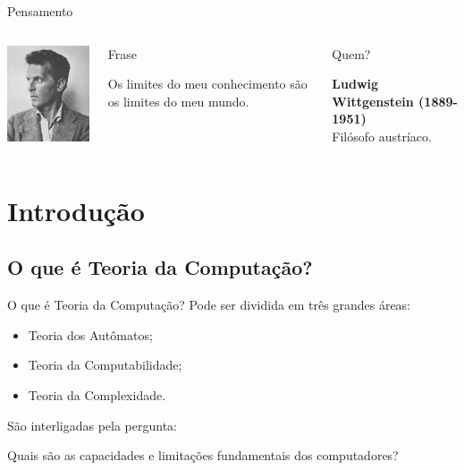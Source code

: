 \documentclass[xcolor=dvipsnames,table]{beamer}
\begin{document}
\begin{frame}{Pensamento}
	\begin{columns}
		\begin{center}
			\includegraphics[height=.5\textheight]{images/wittgenstein.jpg}
		\end{center}
		\begin{block}{Frase}
			\begin{center}
				{\large Os limites do meu conhecimento são os limites do meu mundo.}
			\end{center}
		\end{block}		  		
		\begin{block}{Quem?}
			\begin{center}
				{\bf Ludwig Wittgenstein (1889-1951)} \\ Filósofo austríaco.
			\end{center}
		\end{block}
	\end{columns}
\end{frame}
\section{Introdução}
\subsection{O que é Teoria da Computação?}
\begin{frame}{O que é Teoria da Computação?}
	Pode ser dividida em três grandes áreas:
	\begin{itemize}
		\item Teoria dos Autômatos;
		\item Teoria da Computabilidade;
		\item Teoria da Complexidade.	
	\end{itemize}\pause
	São interligadas pela pergunta:
	\begin{block}{}
		Quais são as capacidades e limitações fundamentais dos computadores?
	\end{block}
\end{frame}
\end{document}
